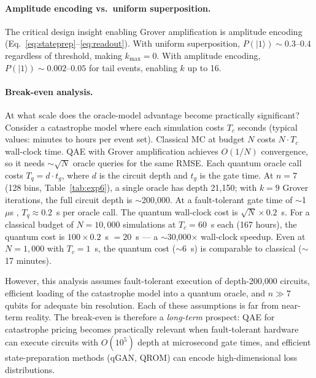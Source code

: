 \documentclass[11pt,a4paper]{article}
\begin{document}
\paragraph{Amplitude encoding vs.\ uniform superposition.} The critical design insight enabling Grover amplification is amplitude encoding (Eq.~\ref{eq:stateprep}--\ref{eq:readout}). With uniform superposition, $P(|1\rangle) \sim 0.3$--$0.4$ regardless of threshold, making $k_{\max} = 0$. With amplitude encoding, $P(|1\rangle) \sim 0.002$--$0.05$ for tail events, enabling $k$ up to 16.

\paragraph{Break-even analysis.} At what scale does the oracle-model advantage become practically significant? Consider a catastrophe model where each simulation costs $T_c$ seconds (typical values: minutes to hours per event set). Classical MC at budget $N$ costs $N \cdot T_c$ wall-clock time. QAE with Grover amplification achieves $O(1/N)$ convergence, so it needs $\sim\!\sqrt{N}$ oracle queries for the same RMSE. Each quantum oracle call costs $T_q = d \cdot t_g$, where $d$ is the circuit depth and $t_g$ is the gate time. At $n = 7$ (128 bins, Table~\ref{tab:exp6}), a single oracle has depth 21{,}150; with $k = 9$ Grover iterations, the full circuit depth is $\sim$200{,}000. At a fault-tolerant gate time of $\sim$1~$\mu$s \citep{reiher2017elucidating}, $T_q \approx 0.2$~s per oracle call. The quantum wall-clock cost is $\sqrt{N} \times 0.2$~s. For a classical budget of $N = 10{,}000$ simulations at $T_c = 60$~s each (167 hours), the quantum cost is $100 \times 0.2$~s $= 20$~s --- a $\sim$30{,}000$\times$ wall-clock speedup. Even at $N = 1{,}000$ with $T_c = 1$~s, the quantum cost ($\sim$6~s) is comparable to classical ($\sim$17 minutes).

However, this analysis assumes fault-tolerant execution of depth-200{,}000 circuits, efficient loading of the catastrophe model into a quantum oracle, and $n \gg 7$ qubits for adequate bin resolution. Each of these assumptions is far from near-term reality. The break-even is therefore a \emph{long-term} prospect: QAE for catastrophe pricing becomes practically relevant when fault-tolerant hardware can execute circuits with $O(10^5)$ depth at microsecond gate times, and efficient state-preparation methods (qGAN, QROM) can encode high-dimensional loss distributions.
\end{document}
